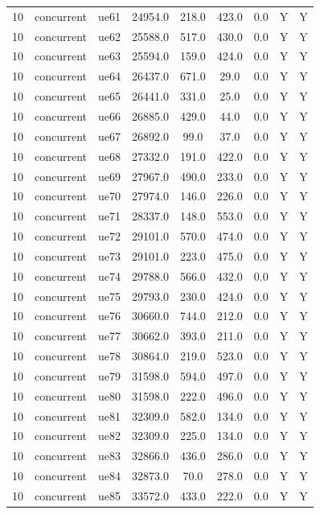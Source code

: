 \begin{table}[ht]
\begin{tabular}{|c|c|c|c|c|c|c|c|c|}
10 & concurrent & ue61 & 24954.0 & 218.0 & 423.0 & 0.0 & Y & Y \\
10 & concurrent & ue62 & 25588.0 & 517.0 & 430.0 & 0.0 & Y & Y \\
10 & concurrent & ue63 & 25594.0 & 159.0 & 424.0 & 0.0 & Y & Y \\
10 & concurrent & ue64 & 26437.0 & 671.0 & 29.0 & 0.0 & Y & Y \\
10 & concurrent & ue65 & 26441.0 & 331.0 & 25.0 & 0.0 & Y & Y \\
10 & concurrent & ue66 & 26885.0 & 429.0 & 44.0 & 0.0 & Y & Y \\
10 & concurrent & ue67 & 26892.0 & 99.0 & 37.0 & 0.0 & Y & Y \\
10 & concurrent & ue68 & 27332.0 & 191.0 & 422.0 & 0.0 & Y & Y \\
10 & concurrent & ue69 & 27967.0 & 490.0 & 233.0 & 0.0 & Y & Y \\
10 & concurrent & ue70 & 27974.0 & 146.0 & 226.0 & 0.0 & Y & Y \\
10 & concurrent & ue71 & 28337.0 & 148.0 & 553.0 & 0.0 & Y & Y \\
10 & concurrent & ue72 & 29101.0 & 570.0 & 474.0 & 0.0 & Y & Y \\
10 & concurrent & ue73 & 29101.0 & 223.0 & 475.0 & 0.0 & Y & Y \\
10 & concurrent & ue74 & 29788.0 & 566.0 & 432.0 & 0.0 & Y & Y \\
10 & concurrent & ue75 & 29793.0 & 230.0 & 424.0 & 0.0 & Y & Y \\
10 & concurrent & ue76 & 30660.0 & 744.0 & 212.0 & 0.0 & Y & Y \\
10 & concurrent & ue77 & 30662.0 & 393.0 & 211.0 & 0.0 & Y & Y \\
10 & concurrent & ue78 & 30864.0 & 219.0 & 523.0 & 0.0 & Y & Y \\
10 & concurrent & ue79 & 31598.0 & 594.0 & 497.0 & 0.0 & Y & Y \\
10 & concurrent & ue80 & 31598.0 & 222.0 & 496.0 & 0.0 & Y & Y \\
10 & concurrent & ue81 & 32309.0 & 582.0 & 134.0 & 0.0 & Y & Y \\
10 & concurrent & ue82 & 32309.0 & 225.0 & 134.0 & 0.0 & Y & Y \\
10 & concurrent & ue83 & 32866.0 & 436.0 & 286.0 & 0.0 & Y & Y \\
10 & concurrent & ue84 & 32873.0 & 70.0 & 278.0 & 0.0 & Y & Y \\
10 & concurrent & ue85 & 33572.0 & 433.0 & 222.0 & 0.0 & Y & Y \\

\end{tabular}
\end{table}
